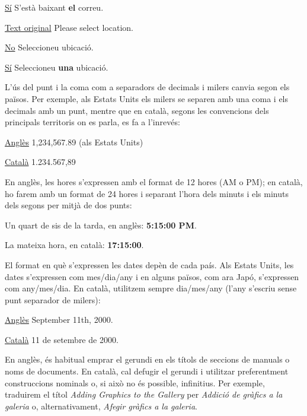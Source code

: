 \documentclass[9pt]{cheatsheet}
\begin{document}
\begin{multicols*}{3}
\underline {Sí} S'està baixant \textbf{el} correu.


\underline {Text original} Please select location.

\underline {No} Seleccioneu ubicació.

\underline {Sí} Seleccioneu \textbf{una} ubicació.




L'ús del punt i la coma com a separadors de decimals i milers canvia segon els països. Per exemple, als Estats Units els milers se separen amb una coma i els decimals amb un punt, mentre que en català, segons les convencions dels principals territoris on es parla, es fa a l'inrevés:

\underline {Anglès} 1,234,567.89 (als Estats Units)

\underline {Català} 1.234.567,89



En anglès, les hores s'expressen amb el format de 12 hores (AM o PM); en català, ho farem amb un format de 24 hores i separant l'hora dels minuts i els minuts dels segons per mitjà de dos punts:

Un quart de sis de la tarda, en anglès: \textbf{5:15:00 PM}.

La mateixa hora, en català: \textbf{17:15:00}.


El format en què s'expressen les dates depèn de cada país. Als Estats Units, les dates s'expressen com mes/dia/any i en alguns països, com ara Japó, s'expressen com any/mes/dia. En català, utilitzem sempre dia/mes/any (l'any s'escriu sense punt separador de milers):

\underline {Anglès} September 11th, 2000.

\underline {Català}	11 de setembre de 2000.



En anglès, és habitual emprar el gerundi en els títols de seccions de manuals o noms de documents. En català, cal defugir el gerundi i utilitzar preferentment construccions nominals o, si això no és possible, infinitius. Per exemple, traduirem el títol \emph{Adding Graphics to the Gallery} per \emph{Addició de gràfics a la galeria} o, alternativament, \emph{Afegir gràfics a la galeria}.


\end{multicols*}
\end{document}
